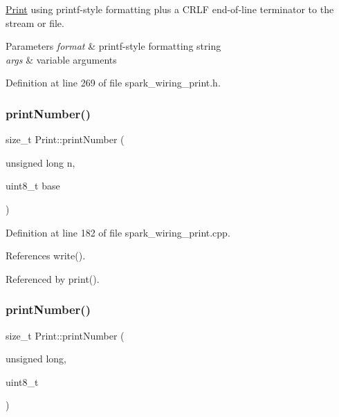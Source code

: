 \hyperlink{class_print}{Print} using printf-\/style formatting plus a C\+R\+LF end-\/of-\/line terminator to the stream or file. 


\begin{DoxyParams}{Parameters}
{\em format} & printf-\/style formatting string\\
\hline
{\em args} & variable arguments \\
\hline
\end{DoxyParams}


Definition at line 269 of file spark\+\_\+wiring\+\_\+print.\+h.

\mbox{\label{class_print_abe7ee1c0946399820a61e1ec39419ee2}} 
\subsubsection{\texorpdfstring{print\+Number()}{printNumber()}\hspace{0.1cm}{\footnotesize\ttfamily [1/2]}}
{\footnotesize\ttfamily size\+\_\+t Print\+::print\+Number (\begin{DoxyParamCaption}\item[{unsigned long}]{n,  }\item[{uint8\+\_\+t}]{base }\end{DoxyParamCaption})\hspace{0.3cm}{\ttfamily [private]}}



Definition at line 182 of file spark\+\_\+wiring\+\_\+print.\+cpp.



References write().



Referenced by print().

\mbox{\label{class_print_abe7ee1c0946399820a61e1ec39419ee2}} 
\subsubsection{\texorpdfstring{print\+Number()}{printNumber()}\hspace{0.1cm}{\footnotesize\ttfamily [2/2]}}
{\footnotesize\ttfamily size\+\_\+t Print\+::print\+Number (\begin{DoxyParamCaption}\item[{unsigned}]{long,  }\item[{uint8\+\_\+t}]{ }\end{DoxyParamCaption})\hspace{0.3cm}{\ttfamily [private]}}

